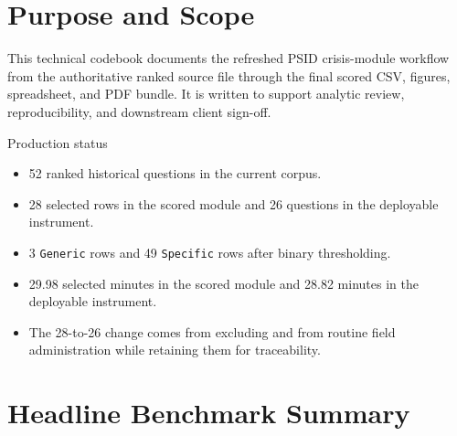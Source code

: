 \documentclass[12pt]{article}
\begin{document}
\makecover

\section{Purpose and Scope}

This technical codebook documents the refreshed PSID crisis-module workflow from the authoritative ranked source file through the final scored CSV, figures, spreadsheet, and PDF bundle. It is written to support analytic review, reproducibility, and downstream client sign-off.

\begin{psidbox}{Production status}
\begin{itemize}
\item 52 ranked historical questions in the current corpus.
\item 28 selected rows in the scored module and 26 questions in the deployable instrument.
\item 3 \texttt{Generic} rows and 49 \texttt{Specific} rows after binary thresholding.
\item 29.98 selected minutes in the scored module and 28.82 minutes in the deployable instrument.
\item The 28-to-26 change comes from excluding  and  from routine field administration while retaining them for traceability.
\end{itemize}
\end{psidbox}

\section{Headline Benchmark Summary}
\end{document}
